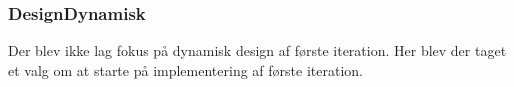 \subsubsection{DesignDynamisk}
Der blev ikke lag fokus på dynamisk design af første iteration. Her blev der taget et valg om at starte på implementering af første iteration.